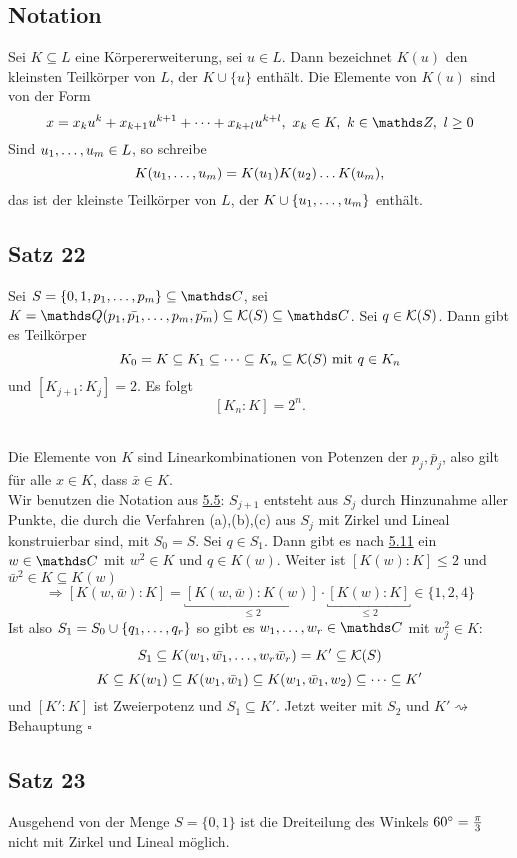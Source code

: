 \subsection{Notation}
\label{sub:notation}
Sei $K\subseteq L$ eine Körpererweiterung, sei $u\in L$.
Dann bezeichnet $K(u)$ den kleinsten Teilkörper von $L$, der $K\cup \{u\}$ enthält.
Die Elemente von $K(u)$ sind von der Form
\[
x=x_ku^k+x_{k+1}u^{k+1}\dt{+}x_{k+l}u^{k+l},~x_k\in K,~k\in \Z,~l\ge0
\]
Sind $u_1, \dots ,u_m\in L$, so schreibe
\[
K(u_1, \dots ,u_m)=K(u_1)K(u_2)\dots K(u_m),
\]
das ist der kleinste Teilkörper von $L$, der $K\cup\{u_1, \dots ,u_m\}$ enthält.

\subsection{Satz 22}
\label{sub:satz_22}
Sei $S=\penbrace{0,1,p_1\dt{,}p_m}\subseteq \C$, sei $K=\Q(p_1,\bar{p_1}\dt{,}p_m,\bar{p_m})\subseteq \mc{K}(S)\subseteq \C$.
Sei $q\in \mathcal{K}(S)$.
Dann gibt es Teilkörper
\[
K_0=K\subseteq K_1\subseteq \dots \subseteq K_n\subseteq \mathcal{K}(S)\text{ mit }q\in K_n
\]
und $[K_{j+1}:K_j]=2$.
Es folgt
\[
[K_n:K]=2^n.
\]

\\
Die Elemente von $K$ sind Linearkombinationen von Potenzen der $p_j,\bar{p}_j$, also gilt für alle $x\in K$, dass $\bar{x}\in K$.\\
Wir benutzen die Notation aus \hyperref[sub:def_koerpererweiterung]{5.5}:
$S_{j+1}$ entsteht aus $S_j$ durch Hinzunahme aller Punkte, die durch die Verfahren (a),(b),(c) aus $S_j$ mit Zirkel und Lineal konstruierbar sind, mit $S_0=S$.
Sei $q\in  S_1$.
Dann gibt es nach \hyperref[sub:lemma_12]{5.11} ein $w\in \C$ mit $w^2\in K$ und $q\in K(w)$.
Weiter ist $[K(w):K]\le 2$ und $\bar{w}^2\in K\subseteq K(w)$
\[
\Rightarrow [K(w,\bar{w}):K]=\underbracket{[K(w,\bar{w}):K(w)]}_{\le 2}\cdot \underbracket{[K(w):K]}_{\le 2}\in \{1,2,4\}
\]
Ist also $S_1=S_0\cup \left\{q_1, \dots ,q_r\right\}$ so gibt es $w_1\dt{,}w_r\in \C$ mit $w_j^2\in K$:
\[
S_1\subseteq K(w_1,\bar{w_1}, \dots ,w_r\bar{w}_r)=K'\subseteq \mathcal{K}(S)
\]
\[
K\subseteq K(w_1)\subseteq K(w_1,\bar{w}_1)\subseteq K(w_1,\bar{w}_1,w_2)\subseteq \dots \subseteq K'
\]
und $[K':K]$ ist Zweierpotenz und $S_1\subseteq K'$.
Jetzt weiter mit $S_2$ und $K'\rightsquigarrow$ Behauptung
\hfill $\square$

\subsection{Satz 23}
\label{sub:satz_23}
Ausgehend von der Menge $S=\{0,1\}$ ist die Dreiteilung des Winkels $60^\circ=\frac{\pi}{3}$ nicht mit Zirkel und Lineal möglich.\\

